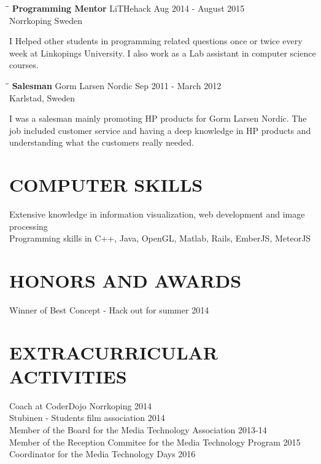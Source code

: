 \documentclass{res}
\begin{document}
\begin{resume}
   \begin{tabbing}
   \hspace{2.3in}\= \hspace{2.6in}\= \kill %
    {\bf Programming Mentor} \>LiTHehack \> Aug 2014 - August 2015\\
                          \>Norrkoping Sweden
   \end{tabbing}\vspace{-20pt}
    I Helped other students in programming related questions once or twice every week at Linkopings University. I also work as a Lab assistant in computer science courses.

   \begin{tabbing}%
   \hspace{2.3in}\= \hspace{2.6in}\= \kill %
   {\bf Salesman}  \>Gorm Larsen Nordic \> Sep 2011 - March 2012\\
                          \>Karlstad, Sweden
   \end{tabbing}\vspace{-20pt}
    I was a salesman mainly promoting HP products for Gorm Larsen Nordic. The job included customer service and having a deep knowledge in HP products and understanding what the customers really needed.        


\section{COMPUTER SKILLS}          
	Extensive knowledge in information visualization, web development and image processing \\   
    Programming skills in C++, Java, OpenGL, Matlab, Rails, EmberJS, MeteorJS
 
 
\section{HONORS AND AWARDS}          
    Winner of Best Concept - Hack out for summer 2014   
 
\section{EXTRACURRICULAR ACTIVITIES}          
    Coach at CoderDojo Norrkoping 2014\\         
    Stubinen - Students film association 2014\\     
    Member of the Board for the Media Technology Association  2013-14\\ 
    Member of the Reception Commitee for the Media Technology Program  2015\\
    Coordinator for the Media Technology Days 2016\\ 

           
 
\end{resume}
\end{document}
